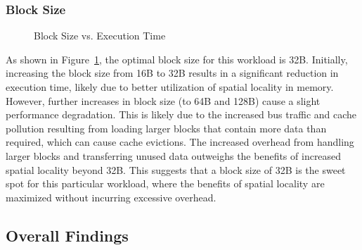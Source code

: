 \documentclass[a4paper,12pt]{article}
\begin{document}
\subsubsection{Block Size}

\begin{figure}[htbp] \centering {} \caption{Block Size vs. Execution Time} \label{fig:block-size} \end{figure}

As shown in Figure~\ref{fig:block-size}, the optimal block size for this workload is 32B. Initially, increasing the block size from 16B to 32B results in a significant reduction in execution time, likely due to better utilization of spatial locality in memory. However, further increases in block size (to 64B and 128B) cause a slight performance degradation. This is likely due to the increased bus traffic and cache pollution resulting from loading larger blocks that contain more data than required, which can cause cache evictions. The increased overhead from handling larger blocks and transferring unused data outweighs the benefits of increased spatial locality beyond 32B. This suggests that a block size of 32B is the sweet spot for this particular workload, where the benefits of spatial locality are maximized without incurring excessive overhead.

\subsection{Overall Findings}
\end{document}
